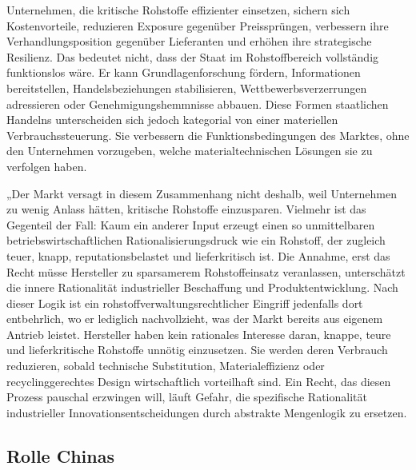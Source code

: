 \documentclass[12pt,a4paper,oneside]{book} %
\begin{document}
{Unternehmen, die kritische Rohstoffe effizienter einsetzen, sichern sich Kostenvorteile, reduzieren Exposure gegenüber Preissprüngen, verbessern ihre Verhandlungsposition gegenüber Lieferanten und erhöhen ihre strategische Resilienz. Das bedeutet nicht, dass der Staat im Rohstoffbereich vollständig funktionslos wäre. Er kann Grundlagenforschung fördern, Informationen bereitstellen, Handelsbeziehungen stabilisieren, Wettbewerbsverzerrungen adressieren oder Genehmigungshemmnisse abbauen. Diese Formen staatlichen Handelns unterscheiden sich jedoch kategorial von einer materiellen Verbrauchssteuerung. Sie verbessern die Funktionsbedingungen des Marktes, ohne den Unternehmen vorzugeben, welche materialtechnischen Lösungen sie zu verfolgen haben.

„Der Markt versagt in diesem Zusammenhang nicht deshalb, weil Unternehmen zu wenig Anlass hätten, kritische Rohstoffe einzusparen. Vielmehr ist das Gegenteil der Fall: Kaum ein anderer Input erzeugt einen so unmittelbaren betriebswirtschaftlichen Rationalisierungsdruck wie ein Rohstoff, der zugleich teuer, knapp, reputationsbelastet und lieferkritisch ist. Die Annahme, erst das Recht müsse Hersteller zu sparsamerem Rohstoffeinsatz veranlassen, unterschätzt die innere Rationalität industrieller Beschaffung und Produktentwicklung. Nach dieser Logik ist ein rohstoffverwaltungsrechtlicher Eingriff jedenfalls dort entbehrlich, wo er lediglich nachvollzieht, was der Markt bereits aus eigenem Antrieb leistet. Hersteller haben kein rationales Interesse daran, knappe, teure und lieferkritische Rohstoffe unnötig einzusetzen. Sie werden deren Verbrauch reduzieren, sobald technische Substitution, Materialeffizienz oder recyclinggerechtes Design wirtschaftlich vorteilhaft sind. Ein Recht, das diesen Prozess pauschal erzwingen will, läuft Gefahr, die spezifische Rationalität industrieller Innovationsentscheidungen durch abstrakte Mengenlogik zu ersetzen.

\subsection{Rolle Chinas}

}
\end{document}
